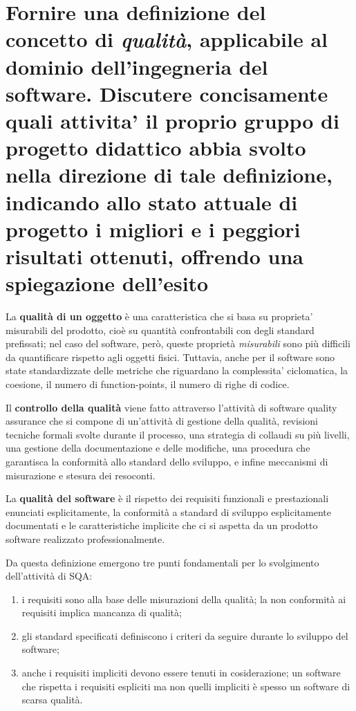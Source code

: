 \section{Fornire una definizione del concetto di \textit{qualità}, applicabile al dominio dell'ingegneria del software. Discutere concisamente quali attivita' il proprio gruppo di progetto didattico abbia svolto nella direzione di tale definizione, indicando allo stato attuale di progetto  i migliori e i peggiori risultati ottenuti, offrendo una spiegazione dell'esito}

La \textbf{qualità di un oggetto} è una caratteristica che si basa su proprieta' misurabili del prodotto, cioè su quantità confrontabili con degli standard prefissati; nel caso del software, però, queste proprietà \textit{misurabili} sono più difficili da quantificare rispetto agli oggetti fisici. Tuttavia, anche per il software sono state standardizzate delle metriche che riguardano la complessita' ciclomatica, la coesione, il numero di function-points, il numero di righe di codice.

Il \textbf{controllo della qualità} viene fatto attraverso l'attività di software quality assurance che si compone di un’attività di gestione della qualità, revisioni tecniche formali svolte durante il processo, una strategia di collaudi su più livelli, una gestione della documentazione e delle modifiche, una procedura che garantisca la conformità allo standard dello sviluppo, e infine meccanismi di misurazione e stesura dei resoconti.

La \textbf{qualità del software} è il rispetto dei requisiti funzionali e prestazionali enunciati esplicitamente, la conformità a standard di sviluppo esplicitamente documentati e le caratteristiche implicite che ci si aspetta da un prodotto software realizzato professionalmente.

Da questa definizione emergono tre punti fondamentali per lo svolgimento dell'attività di SQA:
\begin{enumerate}
 \item i requisiti sono alla base delle misurazioni della qualità; la non conformità ai requisiti implica mancanza di qualità;
\item gli standard specificati definiscono i criteri da seguire durante lo sviluppo del software;
\item anche i requisiti impliciti devono essere tenuti in cosiderazione; un software che rispetta i requisiti
espliciti ma non quelli impliciti è spesso un software di scarsa qualità.
\end{enumerate}

